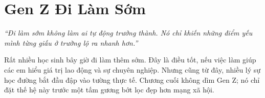 \chapter{Gen Z Đi Làm Sớm}

\begin{center}
	\textit{\color{bookprimary}``Đi làm sớm không làm ai tự động trưởng thành. Nó chỉ khiến những điểm yếu mình từng giấu ở trường lộ ra nhanh hơn.''}
\end{center}

\ngancach

\begin{tcolorbox}[
	colback=bookprimary!6,
	colframe=bookprimary!35,
	arc=5pt,
	title={\bfseries Điểm Chốt Của Chương},
	fonttitle=\bfseries\color{bookprimary}
]
Rất nhiều học sinh bây giờ đi làm thêm sớm. Đây là điều tốt, nếu việc làm giúp các em hiểu giá trị lao động và sự chuyên nghiệp. Nhưng cũng từ đây, nhiều lý sự học đường bắt đầu đập vào tường thực tế. Chương cuối không dìm Gen Z; nó chỉ đặt thế hệ này trước một tấm gương bớt lọc đẹp hơn mạng xã hội.
\end{tcolorbox}

